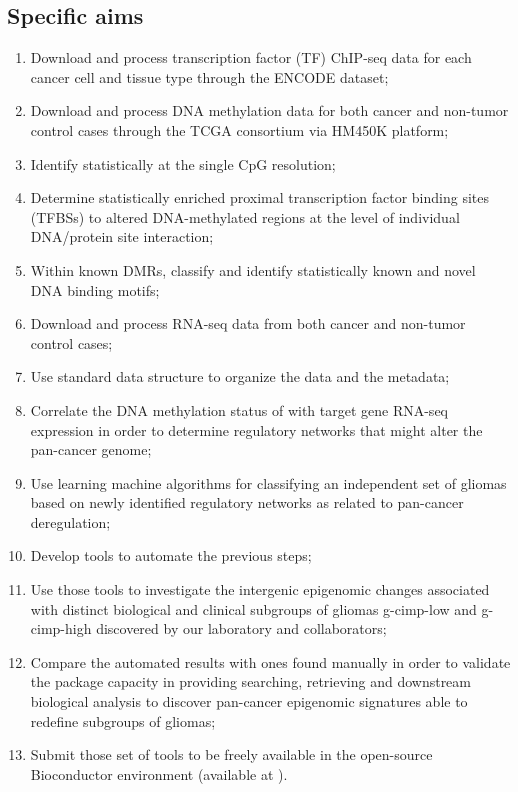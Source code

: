 \subsection{Specific aims}
\begin{enumerate}
    \item Download and process transcription factor (TF) ChIP-seq data for each cancer cell and tissue type through the ENCODE dataset;
    \item Download and process DNA methylation data for both cancer and non-tumor control cases through the TCGA consortium via HM450K platform;
    \item Identify statistically  at the single CpG resolution;
    \item Determine statistically enriched proximal transcription factor binding sites (TFBSs) to altered DNA-methylated regions at the level of individual DNA/protein site interaction;
    \item Within known DMRs, classify and identify statistically known and novel DNA binding motifs;
    \item Download and process RNA-seq data from both cancer and non-tumor control cases;
    \item Use standard data structure to organize the data and the metadata;
    \item Correlate the DNA methylation status of  with target gene RNA-seq expression in order to determine regulatory networks that might alter the pan-cancer genome;
    \item Use learning machine algorithms for classifying an independent set of gliomas based on newly identified regulatory networks as related to pan-cancer deregulation;
    \item Develop tools to automate the previous steps;
    \item Use those tools to investigate the intergenic epigenomic changes associated with distinct biological and clinical subgroups of gliomas g-cimp-low and g-cimp-high discovered by our laboratory and collaborators;
    \item Compare the automated results with ones found manually in order to validate the package capacity in providing searching, retrieving and downstream biological analysis to discover pan-cancer epigenomic signatures able to redefine subgroups of gliomas;
    \item Submit those set of tools to be freely available in the open-source Bioconductor environment (available at ).
\end{enumerate}

